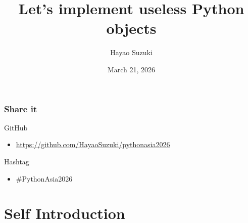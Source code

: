 \documentclass[aspectratio=169,dvipdfmx,12pt,notheorems]{beamer}
\title{Let's implement useless Python objects}
\author[Hayao]{Hayao Suzuki}
\institute[PythonAsia 2026]{PythonAsia 2026 at DE LA SALLE UNIVERSITY, MALATE, MANILA}
\date{March 21, 2026}
\theoremstyle{definition}
\begin{document}
\begin{frame}[plain]\frametitle{}
\titlepage %
\end{frame}

\begin{frame}\frametitle{Share it}

\begin{block}{GitHub}
\begin{itemize}
\item \url{https://github.com/HayaoSuzuki/pythonasia2026}
\end{itemize}
\end{block}

\begin{block}{Hashtag}
\begin{itemize}
\item \#PythonAsia2026
\end{itemize}
\end{block}
\end{frame}

\section{Self Introduction}
\end{document}
